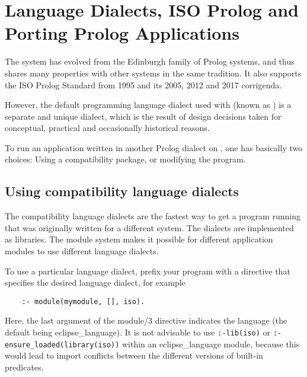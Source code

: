 %
%
%
%
%
%
%

\chapter{Language Dialects, ISO Prolog and Porting Prolog Applications}
\label{chapporting}

The {\eclipse} system has evolved from the Edinburgh family of
Prolog systems, and thus shares many properties with other systems
in the same tradition.  It also supports the
ISO Prolog Standard from 1995 and its 2005, 2012 and 2017 corrigenda.

However, the default programming language dialect used with {\eclipse}
(known as ) is a separate and unique dialect,
which is the result of design decisions taken for conceptual, practical
and occasionally historical reasons.

To run an application written in another Prolog dialect on {\eclipse},
one has basically two choices:
Using a compatibility package, or modifying the program.


\section{Using compatibility language dialects}
The {\eclipse} compatibility language dialects are the fastest way to get a
program running that was originally written for a different system.
The dialects are implemented as libraries.
The module system makes it possible for different application
modules to use different language dialects.

To use a particular language dialect, prefix your program with a
directive that specifies the desired language dialect, for example
\begin{verbatim}
    :- module(mymodule, [], iso).
\end{verbatim}
Here, the last argument of the module/3 directive indicates the language
(the default being eclipse_language).
It is not advisable to use \verb.:-lib(iso). or \verb.:-ensure_loaded(library(iso)).
within an eclipse_language module, because this would lead to import
conflicts between the different versions of built-in predicates.

